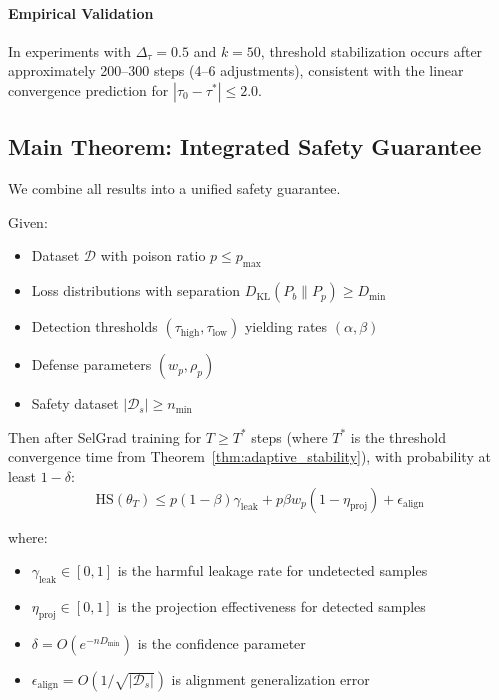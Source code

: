 \paragraph{Empirical Validation}
In experiments with $\Delta_\tau = 0.5$ and $k = 50$, threshold stabilization occurs after approximately 200--300 steps (4--6 adjustments), consistent with the linear convergence prediction for $|\tau_0 - \tau^*| \leq 2.0$.

\subsection{Main Theorem: Integrated Safety Guarantee}
\label{subsec:main_theorem}

We combine all results into a unified safety guarantee.

\begin{theorem}
\label{thm:main}
Given:
\begin{itemize}
\item Dataset $\mathcal{D}$ with poison ratio $p \leq p_{\max}$
\item Loss distributions with separation $D_{\text{KL}}(P_b \| P_p) \geq D_{\min}$
\item Detection thresholds $(\tau_{\text{high}}, \tau_{\text{low}})$ yielding rates $(\alpha, \beta)$
\item Defense parameters $(w_p, \rho_p)$
\item Safety dataset $|\mathcal{D}_s| \geq n_{\min}$
\end{itemize}

Then after SelGrad training for $T \geq T^*$ steps (where $T^*$ is the threshold convergence time from Theorem~\ref{thm:adaptive_stability}), with probability at least $1-\delta$:
\begin{equation}
\text{HS}(\theta_T) \leq p(1-\beta)\gamma_{\text{leak}} + p\beta w_p(1-\eta_{\text{proj}}) + \epsilon_{\text{align}}
\end{equation}

where:
\begin{itemize}
\item $\gamma_{\text{leak}} \in [0, 1]$ is the harmful leakage rate for undetected samples
\item $\eta_{\text{proj}} \in [0, 1]$ is the projection effectiveness for detected samples
\item $\delta = O(e^{-n D_{\min}})$ is the confidence parameter
\item $\epsilon_{\text{align}} = O(1/\sqrt{|\mathcal{D}_s|})$ is alignment generalization error
\end{itemize}
\end{theorem}

